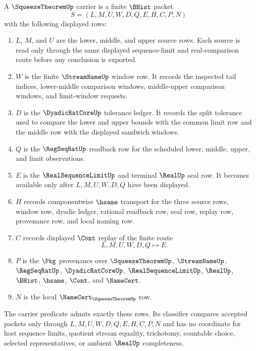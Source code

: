 \begin{definition}
\label{def:squeeze-theorem-carrier}
A $\SqueezeTheoremUp$ carrier is a finite $\BHist$ packet
$$
S=(L,M,U,W,D,Q,E,H,C,P,N)
$$
with the following displayed rows:
\begin{enumerate}
\item $L$, $M$, and $U$ are the lower, middle, and upper source rows. Each source is read only through the same displayed sequence-limit and real-comparison route before any conclusion is exported.
\item $W$ is the finite $\StreamNameUp$ window row. It records the inspected tail indices, lower-middle comparison windows, middle-upper comparison windows, and limit-window requests.
\item $D$ is the $\DyadicRatCoreUp$ tolerance ledger. It records the split tolerance used to compare the lower and upper bounds with the common limit row and the middle row with the displayed sandwich windows.
\item $Q$ is the $\RegSeqRatUp$ readback row for the scheduled lower, middle, upper, and limit observations.
\item $E$ is the $\RealSequenceLimitUp$ and terminal $\RealUp$ seal row. It becomes available only after $L,M,U,W,D,Q$ have been displayed.
\item $H$ records componentwise $\hsame$ transport for the three source rows, window row, dyadic ledger, rational readback row, seal row, replay row, provenance row, and local naming row.
\item $C$ records displayed $\Cont$ replay of the finite route
$$
L,M,U,W,D,Q \longmapsto E .
$$
\item $P$ is the $\Pkg$ provenance over $\SqueezeTheoremUp$, $\StreamNameUp$, $\RegSeqRatUp$, $\DyadicRatCoreUp$, $\RealSequenceLimitUp$, $\RealUp$, $\BHist$, $\hsame$, $\Cont$, and $\NameCert$.
\item $N$ is the local $\NameCert_{\SqueezeTheoremUp}$ row.
\end{enumerate}
The carrier predicate admits exactly these rows. Its classifier compares accepted packets only through $L,M,U,W,D,Q,E,H,C,P,N$ and has no coordinate for host sequence limits, quotient stream equality, trichotomy, countable choice, selected representatives, or ambient $\RealUp$ completeness.
\end{definition}

